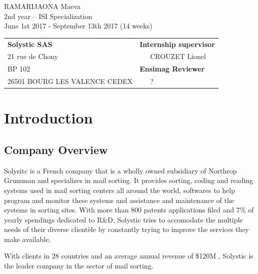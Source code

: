\documentclass[12pt,a4paper,twoside]{article}
\begin{document}
\begin{center}
\vspace{3cm}
RAMARIJAONA Maeva\\
2nd year -- ISI Specialization\\
\vspace{3mm}
June 1st 2017 - September 13th 2017 (14 weeks)\\
\vspace{2cm}
%
%
\begin{tabular}{p{10cm}p{10cm}}
{\bf Solystic SAS}                                            &{\bf Internship supervisor}\\
{\footnotesize 21 rue de Chony}       & ~~~CROUZET Lionel\\
{\footnotesize BP 102}                                        & {\bf Ensimag Reviewer}\\
{\footnotesize 26501 BOURG LES VALENCE CEDEX}                          & ~~~?\\
\end{tabular}
\end{center}
\newpage

\tableofcontents
\newpage
\section{Introduction}

\subsection{Company Overview}%

Solysitc is a French company that is a wholly owned subsidiary of Northrop Grumman and specializes in mail sorting. It provides sorting, coding and reading systems used in mail sorting centers all around the world, softwares to help program and monitor these systems and assistance and maintenance of the systems in sorting sites. With more than 800 patents applications filed and 7\% of yearly spendings dedicated to R\&D, Solystic tries to accomodate the multiple needs of their diverse clientèle by constantly trying to improve the services they make available.

With clients in 28 countries and an average annual revenue of \$120M , Solystic is the leader company in the sector of mail sorting.
\end{document}
